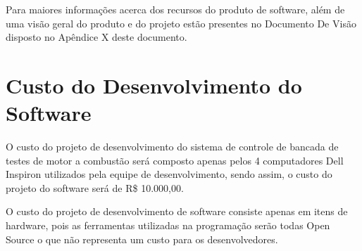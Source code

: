 Para maiores informações acerca dos recursos do produto de software, além de uma visão geral do produto e do projeto estão presentes no Documento De Visão disposto no Apêndice X deste documento.

\section{Custo do Desenvolvimento do Software}

O custo do projeto de desenvolvimento do sistema de controle de bancada de testes de motor a combustão será composto apenas pelos 4 computadores Dell Inspiron utilizados pela equipe de desenvolvimento, sendo assim, o custo do projeto do software será de R\$ 10.000,00.

O custo do projeto de desenvolvimento de software consiste apenas em itens de hardware, pois as ferramentas utilizadas na programação serão todas Open Source o que não representa um custo para os desenvolvedores.